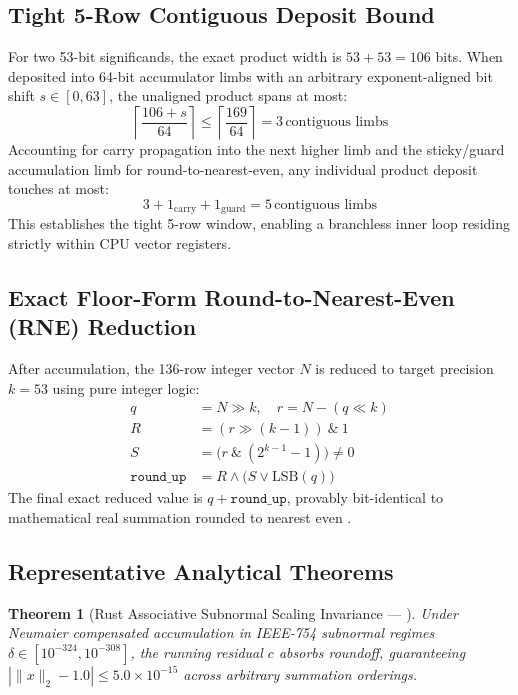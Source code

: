 \documentclass[journal,10pt,compsoc]{IEEEtran}
\theoremstyle{plain}
\newtheorem{theorem}{Theorem}
\theoremstyle{definition}
\begin{document}
\subsection{Tight 5-Row Contiguous Deposit Bound}
For two 53-bit significands, the exact product width is $53 + 53 = 106$ bits. When deposited into 64-bit accumulator limbs with an arbitrary exponent-aligned bit shift $s \in [0, 63]$, the unaligned product spans at most:
\begin{equation}
\label{eq:deposit_span}
\left\lceil \frac{106 + s}{64} \right\rceil \le \left\lceil \frac{169}{64} \right\rceil = 3\,\text{contiguous limbs}
\end{equation}
Accounting for carry propagation into the next higher limb and the sticky/guard accumulation limb for round-to-nearest-even, any individual product deposit touches at most:
\begin{equation}
\label{eq:5row}
3 + 1_{\text{carry}} + 1_{\text{guard}} = 5\,\text{contiguous limbs}
\end{equation}
This establishes the tight 5-row window, enabling a branchless inner loop residing strictly within CPU vector registers.

\subsection{Exact Floor-Form Round-to-Nearest-Even (RNE) Reduction}
After accumulation, the 136-row integer vector $N$ is reduced to target precision $k = 53$ using pure integer logic:
\begin{align}
q &= N \gg k, \quad r = N - (q \ll k) \label{eq:rne_q} \\
R &= (r \gg (k-1)) \ \& \ 1 \label{eq:rne_r} \\
S &= \big( r \ \& \ (2^{k-1} - 1) \big) \ne 0 \label{eq:rne_s} \\
\texttt{round\_up} &= R \land \big( S \lor \mathrm{LSB}(q) \big) \label{eq:rne_up}
\end{align}
The final exact reduced value is $q + \texttt{round\_up}$, provably bit-identical to mathematical real summation rounded to nearest even \cite{neumaier1974rundungsfehleranalyse}.

\subsection{Representative Analytical Theorems}
\begin{theorem}[Rust Associative Subnormal Scaling Invariance --- \label{thm:polydim_0742}]
Under Neumaier compensated accumulation in IEEE-754 subnormal regimes $\delta \in [10^{-324}, 10^{-308}]$, the running residual $c$ absorbs roundoff, guaranteeing $|\|x\|_2 - 1.0| \le 5.0 \times 10^{-15}$ across arbitrary summation orderings.
\end{theorem}
\end{document}
